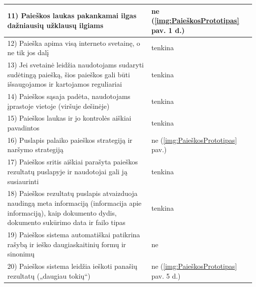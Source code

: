 \documentclass{VUMIFPSkursinis}
\begin{document}
\begin{center}
\begin{tabular}{ |p{13cm}|p{}| }
	11) Paieškos laukas pakankamai ilgas dažniausių užklausų ilgiams & ne (\ref{img:PaieškosPrototipas} pav. 1 d.) \\ \hline
	12) Paieška apima visą interneto svetainę, o ne tik jos dalį & tenkina \\ \hline
	13) Jei svetainė leidžia naudotojams sudaryti sudėtingą paiešką, šios paieškos gali būti išsaugojamos ir kartojamos reguliariai & tenkina \\ \hline
	14) Paieškos sąsaja padėta, naudotojams įprastoje vietoje (viršuje dešinėje) & tenkina \\ \hline
	15) Paieškos laukas ir jo kontrolės aiškiai pavadintos & tenkina \\ \hline
	16) Puslapis palaiko paieškos strategiją ir naršymo strategiją & ne (\ref{img:PaieškosPrototipas} pav.) \\ \hline
	17) Paieškos sritis aiškiai parašyta paieškos rezultatų puslapyje ir naudotojai gali ją susiaurinti & tenkina \\ \hline
	18) Paieškos rezultatų puslapis atvaizduoja naudingą meta informaciją (informacija apie informaciją), kaip dokumento dydis, dokumento sukūrimo data ir failo tipas & tenkina \\ \hline
	19) Paieškos sistema automatiškai patikrina rašybą ir ieško daugiaskaitinių formų ir sinonimų & ne \\ \hline
	20) Paieškos sistema leidžia ieškoti panašių rezultatų („daugiau tokių“) & ne (\ref{img:PaieškosPrototipas} pav. 5 d.) \\ \hline
\end{tabular}
\label{PaieškosLentelėPrad}
\end{center}
\pagebreak
\end{document}
